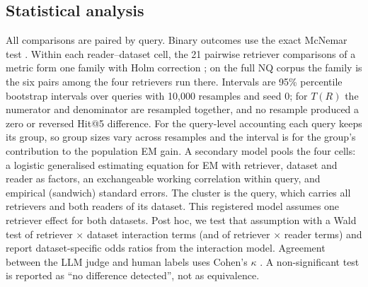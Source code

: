 \subsection{Statistical analysis}\label{sec:stats}
All comparisons are paired by query. Binary outcomes use the exact McNemar test \citep{mcnemar1947}. Within each reader--dataset cell, the 21 pairwise retriever comparisons of a metric form one family with Holm correction \citep{holm1979}; on the full NQ corpus the family is the six pairs among the four retrievers run there. Intervals are 95\% percentile bootstrap intervals over queries \citep{efron1993bootstrap} with 10,000 resamples and seed 0; for $T(R)$ the numerator and denominator are resampled together, and no resample produced a zero or reversed Hit@5 difference. For the query-level accounting each query keeps its group, so group sizes vary across resamples and the interval is for the group's contribution to the population EM gain. A secondary model pools the four cells: a logistic generalised estimating equation \citep{liang1986gee} for EM with retriever, dataset and reader as factors, an exchangeable working correlation within query, and empirical (sandwich) standard errors. The cluster is the query, which carries all retrievers and both readers of its dataset. This registered model assumes one retriever effect for both datasets. Post hoc, we test that assumption with a Wald test of retriever $\times$ dataset interaction terms (and of retriever $\times$ reader terms) and report dataset-specific odds ratios from the interaction model. Agreement between the LLM judge and human labels uses Cohen's $\kappa$ \citep{cohen1960kappa,landis1977}. A non-significant test is reported as ``no difference detected'', not as equivalence.

